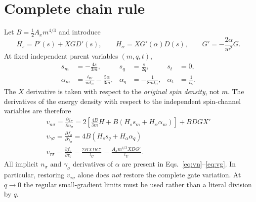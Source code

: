 \documentclass[11pt,a4paper]{article}
\begin{document}
\section{Complete chain rule}
Let $B=\tfrac12A_xm^{4/3}$ and introduce
\begin{equation}H_s=P'(s)+XG D'(s),\qquad H_\alpha=XG'(\alpha)D(s),\qquad G'=-\frac{2\alpha}{w^2}G.\end{equation}
At fixed independent parent variables $(m,q,t)$,
\begin{align}
s_m&=-\frac{4s}{3m},&s_q&=\frac{s}{2q},&s_t&=0,\\
\alpha_m&=\frac{t_W}{mt_U}-\frac{5\alpha}{3m},&
\alpha_q&=-\frac1{8mt_U},&\alpha_t&=\frac1{t_U}.
\label{eq:chain}
\end{align}
The $X$ derivative is taken with respect to the \emph{original spin density}, not $m$. The derivatives of the energy density with respect to the independent spin-channel variables are therefore
\begin{align}
\boxed{v_{n\sigma}=\frac{\partial f_\sigma}{\partial n_\sigma}=2\left[\frac{4B}{3m}H+B(H_ss_m+H_\alpha\alpha_m)\right]+BDG X'}\label{eq:vn}\\[4pt]
\boxed{v_{\gamma\sigma}=\frac{\partial f_\sigma}{\partial\gamma_\sigma}=4B(H_ss_q+H_\alpha\alpha_q)}\label{eq:vg}\\[4pt]
\boxed{v_{\tau\sigma}=\frac{\partial f_\sigma}{\partial\tau_\sigma}=\frac{2BXDG'}{t_U}=\frac{A_xm^{4/3}XDG'}{t_U}.}\label{eq:vt}
\end{align}
All implicit $n_\sigma$ and $\gamma_\sigma$ derivatives of $\alpha$ are present in Eqs.~\eqref{eq:vn}--\eqref{eq:vg}. In particular, restoring $v_{\tau\sigma}$ alone does \emph{not} restore the complete gate variation. At $q\to0$ the regular small-gradient limits must be used rather than a literal division by $q$.
\end{document}
